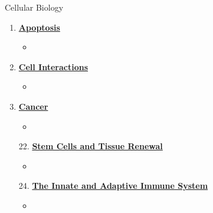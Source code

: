 \documentclass[12pt,letterpaper]{article}
\begin{document}
\begin{contbox}{Cellular Biology}
{\begin{enumerate}[font=\bfseries, wide]
    \begin{itemize}
        \item 
    \end{itemize}
    \item \hyperlink{18}{\textbf{Apoptosis}}
    \begin{itemize}
        \item 
    \end{itemize}
    \item \hyperlink{19}{\textbf{Cell Interactions}}
    \begin{itemize}
        \item 
    \end{itemize}
    \item \hyperlink{20}{\textbf{Cancer}}
    \begin{itemize}
        \item 
    \end{itemize}    
    \item[22.] \hyperlink{22}{\textbf{Stem Cells and Tissue Renewal}}
    \begin{itemize}
        \item 
    \end{itemize}
    \item[24.] \hyperlink{24}{\textbf{The Innate and Adaptive Immune System}}
    \begin{itemize}
        \item 
    \end{itemize}
\end{enumerate}
}\end{contbox}



\end{document}
